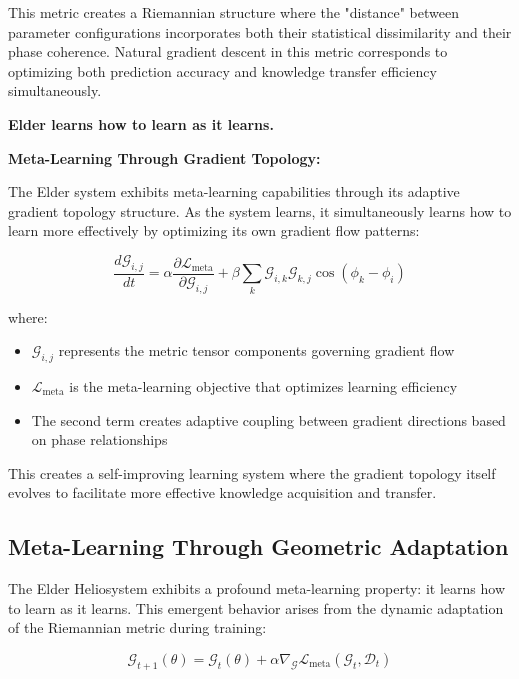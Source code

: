 This metric creates a Riemannian structure where the "distance" between parameter configurations incorporates both their statistical dissimilarity and their phase coherence. Natural gradient descent in this metric corresponds to optimizing both prediction accuracy and knowledge transfer efficiency simultaneously.

\begin{tcolorbox}[colback=blue!5!white,colframe=blue!50!black,title=Key Insight]
\textbf{Elder learns how to learn as it learns.}
\end{tcolorbox}

\textbf{Meta-Learning Through Gradient Topology:}

The Elder system exhibits meta-learning capabilities through its adaptive gradient topology structure. As the system learns, it simultaneously learns how to learn more effectively by optimizing its own gradient flow patterns:

\begin{equation}
\frac{d\mathcal{G}_{i,j}}{dt} = \alpha \frac{\partial \mathcal{L}_{\text{meta}}}{\partial \mathcal{G}_{i,j}} + \beta \sum_{k} \mathcal{G}_{i,k} \mathcal{G}_{k,j} \cos(\phi_k - \phi_i)
\end{equation}

where:
\begin{itemize}
    \item $\mathcal{G}_{i,j}$ represents the metric tensor components governing gradient flow
    \item $\mathcal{L}_{\text{meta}}$ is the meta-learning objective that optimizes learning efficiency
    \item The second term creates adaptive coupling between gradient directions based on phase relationships
\end{itemize}

This creates a self-improving learning system where the gradient topology itself evolves to facilitate more effective knowledge acquisition and transfer.

\subsection{Meta-Learning Through Geometric Adaptation}

The Elder Heliosystem exhibits a profound meta-learning property: it learns how to learn as it learns. This emergent behavior arises from the dynamic adaptation of the Riemannian metric during training:

\begin{equation}
\mathcal{G}_{t+1}(\theta) = \mathcal{G}_t(\theta) + \alpha \nabla_{\mathcal{G}} \mathcal{L}_{\text{meta}}(\mathcal{G}_t, \mathcal{D}_t)
\end{equation}


